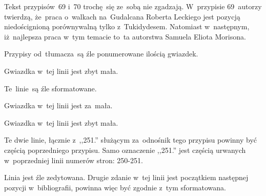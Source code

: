 \documentclass[a4paper,11pt]{article}
\begin{document}
\start {} Tekst przypisów~69 i~70 trochę~się ze~sobą nie
zgadzają. W~przypisie 69~autorzy twierdzą, że~praca o~walkach
na~Gudalcana Roberta Leckiego jest pozycją niedoścignioną porównywalną
tylko z~Tukidydesem. Natomiast w~następnym, iż~najlepsza praca w~tym
temacie to~ta autorstwa Samuela Eliota Morisona.

\vspace{\spaceFour}


\start {} Przypisy od~tłumacza~są źle ponumerowane ilością
gwiazdek.

\vspace{\spaceFour}


\start {} Gwiazdka w~tej linii jest zbyt mała.

\vspace{\spaceFour}


\start {} Te~linie~są źle sformatowane.

\vspace{\spaceFour}


\start {} Gwiazdka w~tej linii jest za~mała.

\vspace{\spaceFour}


\start {} Gwiazdka w~tej linii jest zbyt mała.

\vspace{\spaceFour}


\start {} Te dwie linie, łącznie z~,,251.'' służącym
za~odnośnik tego przypisu powinny być częścią poprzedniego przypisu.
Samo oznaczenie ,,251.'' jest częścią urwanych w~poprzedniej linii
numerów stron: 250-251.

\vspace{\spaceFour}


\start {} Linia jest źle zedytowana. Drugie zdanie w~tej
linii jest początkiem następnej pozycji w~bibliografii, powinna więc
być zgodnie z~tym sformatowana.

\vspace{\spaceFour}
\end{document}
